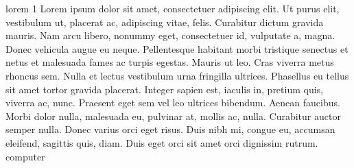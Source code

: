 \documentclass[12pt, a4paper, twoside]{report}
\begin{document}
\newpage

\gls{lorem 1}
Lorem ipsum dolor sit amet, consectetuer adipiscing elit. Ut purus elit, vestibulum ut,
placerat ac, adipiscing vitae, felis. Curabitur dictum gravida mauris. Nam arcu libero,
nonummy eget, consectetuer id, vulputate a, magna. Donec vehicula augue eu neque.
Pellentesque habitant morbi tristique senectus et netus et malesuada fames ac turpis
egestas. Mauris ut leo. Cras viverra metus rhoncus sem. Nulla et lectus vestibulum urna
fringilla ultrices. Phasellus eu tellus sit amet tortor gravida placerat. Integer sapien est,
iaculis in, pretium quis, viverra ac, nunc. Praesent eget sem vel leo ultrices bibendum.
Aenean faucibus. Morbi dolor nulla, malesuada eu, pulvinar at, mollis ac, nulla. Curabitur
auctor semper nulla. Donec varius orci eget risus. Duis nibh mi, congue eu, accumsan
eleifend, sagittis quis, diam. Duis eget orci sit amet orci dignissim rutrum.\\

\gls{computer}


\printglossaries


\printindex



\end{document}
